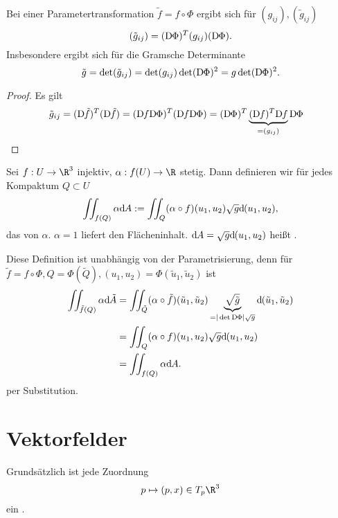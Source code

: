 
\begin{lem}
	Bei einer Parametertransformation $\tilde f = f \circ \Phi$ ergibt sich für $(g_{ij}), (\tilde g_{ij})$
	\[
		(\tilde g_{ij}) = (\Df[\Phi])^T(g_{ij})(\Df[\Phi]).
	\]
	Insbesondere ergibt sich für die Gramsche Determinante
	\[
		\tilde g = \det(\tilde g_{ij})
		= \det(g_{ij}) \det(\Df[\Phi])^2
		= g \det(\Df[\Phi])^2.
	\]
	\begin{proof}
		Es gilt
		\begin{align*}
			\tilde g_{ij} &= (\Df[\tilde f])^T (\Df[ \tilde f])
			= (\Df \Df[\Phi])^T (\Df \Df[\Phi])
			= (\Df[\Phi])^T \underbrace{(\Df)^T \Df}_{=(g_{ij})} \Df[\Phi]
		\end{align*}
	\end{proof}
\end{lem}

\begin{df}[Oberflächenintegral]
	Sei $f: U \to \R^3$ injektiv, $\alpha: f(U) \to \R$ stetig.
	Dann definieren wir für jedes Kompaktum $Q \subset U$
	\[
		\iint_{f(Q)} \alpha \dx[A]
		:= \iint_{Q} (\alpha \circ f)(u_1, u_2) \sqrt{g} \dx[(u_1, u_2)],
	\]
	das  von $\alpha$.
	$\alpha = 1$ liefert den Flächeninhalt.
	$\dx[A] = \sqrt{g} \dx[(u_1, u_2)]$ heißt .
	\begin{note}
		Diese Definition ist unabhängig von der Parametrisierung, denn für $\tilde f = f \circ \Phi, Q = \Phi(\tilde Q), (u_1,u_2) = \Phi(\tilde u_1, \tilde u_2)$ ist
		\begin{align*}
			\iint_{\tilde f(Q)} \alpha \dx[\tilde A]
			&= \iint_{\tilde Q} (\alpha \circ \tilde f)(\tilde u_1, \tilde u_2) \underbrace{\sqrt{\tilde g}}_{=|\det \Df[\Phi]| \sqrt{g}} \dx[(\tilde u_1, \tilde u_2)] \\
			&= \iint_{Q} (\alpha \circ f) (u_1, u_2) \sqrt{g} \dx[(u_1, u_2)] \\
			&= \iint_{f(Q)} \alpha \dx[A].
		\end{align*}
		per Substitution.
	\end{note}
\end{df}

\section{Vektorfelder}


Grundsätzlich ist jede Zuordnung
\[
	p \mapsto (p, x) \in T_p\R^3
\]
ein .

